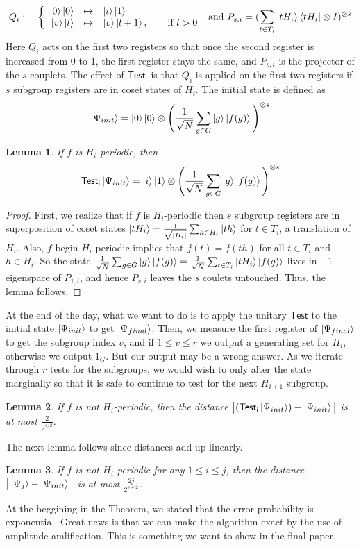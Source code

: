 \documentclass[12pt]{article}
\theoremstyle{plain}
\newtheorem{lem}{Lemma}
\theoremstyle{definition}
\begin{document}
$$Q_i:\quad\left\lbrace
\begin{array}{rcl}
\left\vert{0}\right\rangle\left\vert{0}\right\rangle & \mapsto & \left\vert{i}\right\rangle\left\vert{1}\right\rangle \\
\left\vert{v}\right\rangle\left\vert{l}\right\rangle & \mapsto & \left\vert{v}\right\rangle\left\vert{l+1}\right\rangle,
\qquad\text{if $l>0$}
\end{array}
\right.
\text{ and  } P_{s,i}=(\sum_{t\in T_i}\left\vert{tH_i}\right\rangle\left\langle{tH_i}\right\vert\otimes I)^{\otimes s}
$$
Here $Q_i$ acts on the first two registers so that once the second register is increased from 0 to 1, the first register stays the same, and $P_{s,i}$ is the projector of the $s$ couplets. The effect of $\mathsf{Test_i}$ is that $Q_i$ is applied on the first two registers if $s$ subgroup registers are in coset states of $H_i$.
\newline
The initial state is defined as
$$\left\vert{\Psi_{init}}\right\rangle=\left\vert{0}\right\rangle\left\vert{0}\right\rangle\otimes\Bigg(\frac{1}{\sqrt{N}}\sum_{g\in G}\left\vert{g}\right\rangle\left\vert{f(g)}\right\rangle\Bigg)^{\otimes s}$$
\begin{lem}
If $f$ is $H_i$-periodic, then
$$\mathsf{Test_i}\left\vert{\Psi_{init}}\right\rangle=\left\vert{i}\right\rangle\left\vert{1}\right\rangle\otimes\Bigg(\frac{1}{\sqrt{N}}\sum_{g\in G}\left\vert{g}\right\rangle\left\vert{f(g)}\right\rangle\Bigg)^{\otimes s}$$
\end{lem}
\begin{proof}
First, we realize that if $f$ is $H_i$-periodic then $s$ subgroup registers are in superposition of coset states $\left\vert{tH_i}\right\rangle=\frac{1}{\sqrt{|H_i|}}\sum_{h\in H_i}\left\vert{th}\right\rangle$ for $t\in T_i$, a translation of $H_i$. Also, $f$ begin $H_i$-periodic implies that $f(t)=f(th)$ for all $t\in T_i$ and $h\in H_i$. So the state $\frac{1}{\sqrt{N}}\sum_{g\in G}\left\vert{g}\right\rangle\left\vert{f(g)}\right\rangle=\frac{1}{\sqrt{N}}\sum_{t\in T_i}\left\vert{tH_i}\right\rangle\left\vert{f(g)}\right\rangle$ lives in +1-eigenspace of $P_{1,i}$, and hence $P_{s,i}$ leaves the $s$ coulets untouched. Thus, the lemma follows.
\end{proof}
\noindent At the end of the day, what we want to do is to apply the unitary $\mathsf{Test}$ to the initial state $\left\vert{\Psi_{init}}\right\rangle$ to get $\left\vert{\Psi_{final}}\right\rangle$. Then, we measure the first register of $\left\vert{\Psi_{final}}\right\rangle$ to get the subgroup index $v$, and if $1\leq v \leq r$ we output a generating set for $H_i$, otherwise we output ${1_G}$. But our output may be a wrong answer.
\newline
As we iterate through $r$ tests for the subgroups, we would wish to only alter the state marginally so that it is safe to continue to test for the next $H_{i+1}$ subgroup.
\begin{lem}
If $f$ is not $H_i$-periodic, then the distance $\big|(\mathsf{Test_i}\left\vert{\Psi_{init}}\right\rangle)-\left\vert{\Psi_{init}}\right\rangle\big|$ is at most $\frac{2}{2^{s/2}}$.
\end{lem}
\noindent The next lemma follows since distances add up linearly.
\begin{lem}
If $f$ is not $H_i$-periodic for any $1\leq i \leq j$, then the distance $\big|\left\vert{\Psi_j}\right\rangle-\left\vert{\Psi_{init}}\right\rangle\big|$ is at most $\frac{2j}{2^{s+2}}$.
\end{lem}
\noindent At the beggining in the Theorem, we stated that the error probability is exponential. Great news is that we can make the algorithm exact by the use of amplitude amlification. This is something we want to show in the final paper.
\end{document}
